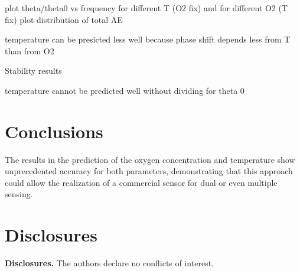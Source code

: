\documentclass[9pt,twocolumn,twoside,pdftex]{optica}
\begin{document}
plot theta/theta0 vs frequency for different T (O2 fix) and for different O2 (T fix)
plot distribution of total AE

temperature can be presicted less well because phase shift depends less from T than from O2

Stability results

temperature cannot be predicted well without dividing for theta 0




\section{Conclusions}

The results in the prediction of the oxygen concentration and temperature show unprecedented accuracy for both parameters, demonstrating that this approach could allow the realization of a commercial sensor for dual or even multiple sensing.





\section*{Disclosures}

\medskip

\noindent\textbf{Disclosures.} The authors declare no conflicts of interest.






\end{document}
